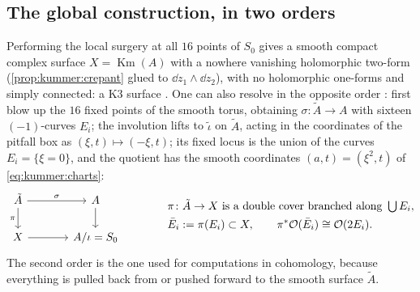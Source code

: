 \subsection{The global construction, in two orders}

Performing the local surgery at all $16$ points of $S_0$ gives a smooth compact complex
surface $X=\operatorname{Km}(A)$ with a nowhere vanishing holomorphic two-form
(\cref{prop:kummer:crepant} glued to $\dd z_1\wedge\dd z_2$), with no holomorphic one-forms
and simply connected: a K3 surface \TL{} . One can also resolve in the opposite order
: first blow up the $16$ fixed points of
the smooth torus, obtaining $\sigma\colon\tilde A\to A$ with sixteen $(-1)$-curves $E_i$; the
involution lifts to $\tilde\iota$ on $\tilde A$, acting in the coordinates of the pitfall box
as $(\xi,t)\mapsto(-\xi,t)$; its fixed locus is the union of the curves $E_i=\{\xi=0\}$, and
the quotient has the smooth coordinates $(a,t)=(\xi^2,t)$ of \eqref{eq:kummer:charts}:
\begin{equation}\label{eq:kummer:square}
\begin{tikzcd}[column sep=large]
  \tilde A \arrow[r,"\sigma"] \arrow[d,"\pi"'] & A \arrow[d] \\
  X \arrow[r] & A/\iota=S_0
\end{tikzcd}
\qquad\qquad
\begin{aligned}
  &\pi\colon\tilde A\to X \text{ is a double cover branched along } \textstyle\bigcup E_i,\\
  &\bar E_i:=\pi(E_i)\subset X,\qquad \pi^*\mathcal{O}(\bar E_i)\cong\mathcal{O}(2E_i).
\end{aligned}
\end{equation}
The second order is the one used for computations in cohomology, because everything is
pulled back from or pushed forward to the smooth surface $\tilde A$.

